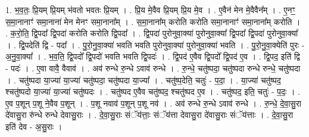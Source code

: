 \documentclass[17pt]{extarticle}
\begin{document}
1. भ॒व॒तः॒ प्रि॒यम् प्रि॒यम् भ॑वतो भवतः प्रि॒यम् । . प्रि॒य मे॒वैव प्रि॒यम् प्रि॒य मे॒व । . ए॒वैन॑ मेन मे॒वैवैन᳚म् । . ए॒नꣳ॒॒ स॒मा॒नानाꣳ॑ समा॒नाना॑ मेन मेनꣳ समा॒नाना᳚म् । . स॒मा॒नाना᳚म् करोति करोति समा॒नानाꣳ॑ समा॒नाना᳚म् करोति । . क॒रो॒ति॒ द्वि॒पदा᳚ द्वि॒पदा॑ करोति करोति द्वि॒पदा᳚ । . द्वि॒पदा॑ पुरोनुवा॒क्या॑ पुरोनुवा॒क्या᳚ द्वि॒पदा᳚ द्वि॒पदा॑ पुरोनुवा॒क्या᳚ । . द्वि॒पदेति॑ द्वि - पदा᳚ । . पु॒रो॒नु॒वा॒क्या॑ भवति भवति पुरोनुवा॒क्या॑ पुरोनुवा॒क्या॑ भवति । . पु॒रो॒नु॒वा॒क्येति॑ पुरः - अ॒नु॒वा॒क्या᳚ । . भ॒व॒ति॒ द्वि॒पदो᳚ द्वि॒पदो॑ भवति भवति द्वि॒पदः॑ । . द्वि॒पद॑ ए॒वैव द्वि॒पदो᳚ द्वि॒पद॑ ए॒व । . द्वि॒पद॒ इति॑ द्वि - पदः॑ । . ए॒वा वावै॒ वैवाव॑ । . अव॑ रुन्धे रु॒न्धे ऽवाव॑ रुन्धे । . रु॒न्धे॒ चतु॑ष्पदा॒ चतु॑ष्पदा रुन्धे रुन्धे॒ चतु॑ष्पदा । . चतु॑ष्पदा या॒ज्या॑ या॒ज्या॑ चतु॑ष्पदा॒ चतु॑ष्पदा या॒ज्या᳚ । . चतु॑ष्प॒देति॒ चतुः॑ - प॒दा॒ । . या॒ज्या॑ चतु॑ष्पद॒ श्चतु॑ष्पदो या॒ज्या॑ या॒ज्या॑ चतु॑ष्पदः । . चतु॑ष्पद ए॒वैव चतु॑ष्पद॒ श्चतु॑ष्पद ए॒व । . चतु॑ष्पद॒ इति॒ चतुः॑ - प॒दः॒ । . ए॒व प॒शून् प॒शू ने॒वैव प॒शून् । . प॒शू नवाव॑ प॒शून् प॒शू नव॑ । . अव॑ रुन्धे रु॒न्धे ऽवाव॑ रुन्धे । . रु॒न्धे॒ दे॒वा॒सु॒रा दे॑वासु॒रा रु॑न्धे रुन्धे देवासु॒राः । . दे॒वा॒सु॒राः संॅय॑त्ताः॒ संॅय॑त्ता देवासु॒रा दे॑वासु॒राः संॅय॑त्ताः । . दे॒वा॒सु॒रा इति॑ देव - अ॒सु॒राः । \newline
\end{document}
